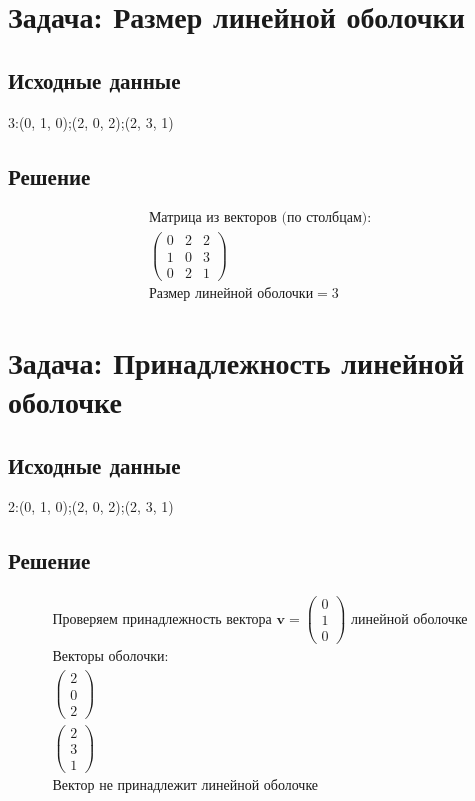 \documentclass{article}
\begin{document}
\section{Задача: Размер линейной оболочки}
\subsection{Исходные данные}
3:(0, 1, 0);(2, 0, 2);(2, 3, 1)
\subsection{Решение}
\begin{align*}
\text{Матрица из векторов (по столбцам):}\\
\begin{pmatrix}
0 & 2 & 2\\
1 & 0 & 3\\
0 & 2 & 1\end{pmatrix}
\\
\text{Размер линейной оболочки} = 3
\end{align*}
\section{Задача: Принадлежность линейной оболочке}
\subsection{Исходные данные}
2:(0, 1, 0);(2, 0, 2);(2, 3, 1)
\subsection{Решение}
\begin{align*}
\text{Проверяем принадлежность вектора } \mathbf{v} = \begin{pmatrix}0 \\ 1 \\ 0\end{pmatrix} \text{ линейной оболочке}\\
\text{Векторы оболочки:}\\
\begin{pmatrix}2 \\ 0 \\ 2\end{pmatrix}\\
\begin{pmatrix}2 \\ 3 \\ 1\end{pmatrix}\\
\text{Вектор не принадлежит линейной оболочке}
\end{align*}
\end{document}
